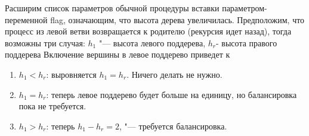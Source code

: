 \begin{frame}
    Расширим список параметров обычной процедуры вставки параметром-переменной flag,
    означающим, что высота дерева увеличилась.
    Предположим, что процесс из левой ветви возвращается к родителю (рекурсия идет назад),
    тогда возможны три случая:
    {$h_1$ "--- высота левого поддерева, $h_r$- высота правого поддерева}
    Включение вершины в левое поддерево приведет к

    \begin{enumerate}
        \item $h_1 < h_r$: выровняется $h_1 = h_r$. Ничего делать не нужно.
        \item $h_1 = h_r$: теперь левое поддерево будет больше на единицу,
        но балансировка пока не требуется.
        \item $h_1 > h_r$: теперь $h_1 - h_r = 2$, "--- требуется балансировка.
    \end{enumerate}
\end{frame}